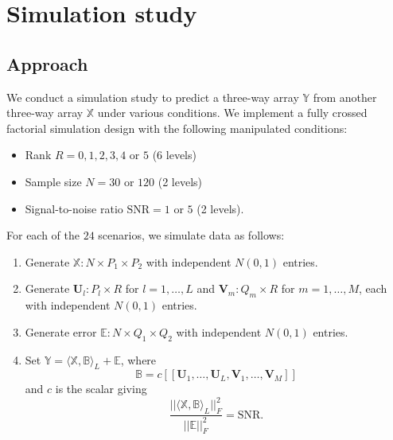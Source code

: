 \documentclass[12pt]{article}
\def\U{\mathbf{U}}
\def\XX{\mathbb{X}}
\def\YY{\mathbb{Y}}
\def\EE{\mathbb{E}}
\def\V{\mathbf{V}}
\def\BB{\mathbb{B}}
\def\tp#1{[\![#1]\!]}
\newcommand{\tprod}[3] {
  \langle #1, #2 \rangle_{#3}}
\DeclareMathOperator*{\amin}{arg\,min}
\def\argmin#1{\underset{#1}{\amin}}
\DeclareMathOperator*{\rank}{rank}
\begin{document}

\section{Simulation study}
\label{sims}

\subsection{Approach}
\label{sims_approach}
We conduct a simulation study to predict a three-way array $\YY$ from another three-way array $\XX$ under various conditions. We implement a fully crossed factorial simulation design with the following manipulated conditions: 
\begin{itemize}
\item Rank $R = 0,1,2,3,4$ or $5$ (6 levels)
\item Sample size $N = 30$ or $120$ (2 levels)
\item Signal-to-noise ratio $\mbox{SNR} = 1$ or $5$ (2 levels).	
\end{itemize}
For each of the $24$ scenarios, we simulate data as follows:
\begin{enumerate}
\item Generate $\XX: N \times P_1 \times P_2$ with independent $N(0,1)$ entries.
\item Generate $\U_l: P_l \times R$ for $l=1,\hdots,L$ and $\V_m: Q_m \times R$ for $m=1,\hdots,M$, each with independent $N(0,1)$ entries.
\item Generate error $\EE: N \times Q_1 \times Q_2$ with independent $N(0,1)$ entries.
\item Set $\YY = \tprod{\XX}{\BB}{L} + \EE$, where 
\[\BB = c \tp{\U_1,\hdots,\U_L, \V_1,\hdots,\V_M}\]
and $c$ is the scalar giving 
\[\frac{||\tprod{\XX}{\BB}{L}||^2_F}{||\EE||^2_F} = \mbox{SNR}.\]
\end{enumerate}
 
\end{document}

